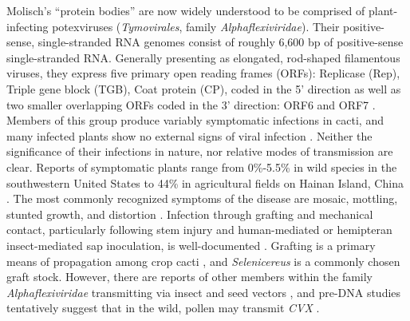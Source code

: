 \documentclass[fleqn,10pt,lineno]{wlpeerj}
\begin{document}
Molisch's ``protein bodies'' are now widely understood to be comprised of plant-infecting potexviruses (\textit{Tymovirales}, family \textit{Alphaflexiviridae}).
Their positive-sense, single-stranded RNA genomes consist of roughly 6,600 bp of positive-sense single-stranded RNA. %
Generally presenting as elongated, rod-shaped filamentous viruses, they express five primary open reading frames (ORFs): Replicase (Rep), Triple gene block (TGB), Coat protein (CP), coded in the 5' direction as well as two smaller overlapping ORFs coded in the 3' direction: ORF6 and ORF7 \citep{evallo_brief_2021,liou_complete_2004, martelli_family_2007}. %
Members of this group produce variably symptomatic infections in cacti, and many infected plants show no external signs of viral infection \citep{bos_symptoms_1977, liou_complete_2004}. 
Neither the significance of their infections in nature, nor relative modes of transmission are clear. 
Reports of symptomatic plants range from 0\%-5.5\% in wild species in the southwestern United States \citep{attathom_occurrence_1978} to 44\% in agricultural fields on Hainan Island, China \citep{peng_molecular_2016}.
The most commonly recognized symptoms of the disease are mosaic, mottling, stunted growth, and distortion \citep{attathom_occurrence_1978, maliarenko_cactus_2013, peng_molecular_2016}.
Infection through grafting and mechanical contact, particularly following stem injury and human-mediated or hemipteran insect-mediated sap inoculation, is well-documented \citep{liou_complete_2004,maliarenko_cactus_2013,park_detection_2018}.
Grafting is a primary means of propagation among crop cacti \citep{park_detection_2018}, and \textit{Selenicereus} is a commonly chosen graft stock.
However, there are reports of other members within the family \textit{Alphaflexiviridae} transmitting via insect and seed vectors \citep{martelli_family_2007}, and pre-DNA studies tentatively suggest that in the wild, pollen may transmit \textit{CVX} \citep{attathom_occurrence_1978}.
\end{document}
